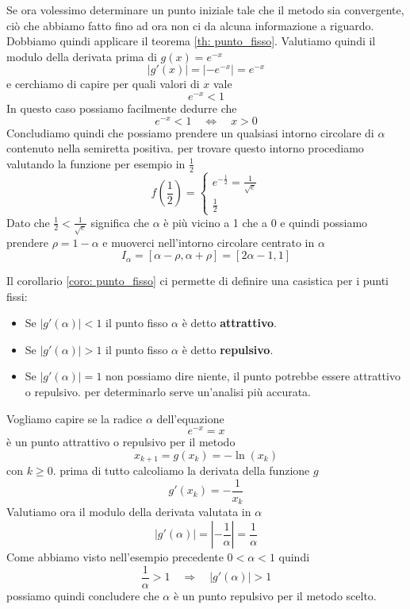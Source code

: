 \begin{example}
	Se ora volessimo determinare un punto iniziale tale che il metodo sia convergente, ciò che abbiamo fatto
	fino ad ora non ci da alcuna informazione a riguardo. Dobbiamo quindi applicare il teorema
	\ref{th: punto_fisso}. Valutiamo quindi il modulo della derivata prima di $g(x) = e^{-x}$
	\[ |g'(x)| = |-e^{-x}| = e^{-x} \]
	e cerchiamo di capire per quali valori di $x$ vale
	\[ e^{-x} < 1 \]
	In questo caso possiamo facilmente dedurre che
	\[ e^{-x} < 1 \quad \Leftrightarrow \quad x > 0 \]
	Concludiamo quindi che possiamo prendere un qualsiasi intorno circolare di $\alpha$ contenuto nella semiretta
	positiva. per trovare questo intorno procediamo valutando la funzione per esempio in $\frac{1}{2}$
	\[
		f \left( \frac{1}{2} \right) = \begin{cases}
			e^{-\frac{1}{2}} = \frac{1}{\sqrt{e}} \\
			\frac{1}{2}
		\end{cases}
	\]
	Dato che $\frac{1}{2} < \frac{1}{\sqrt{e}}$ significa che $\alpha$ è più vicino a 1 che a 0 e quindi possiamo
	prendere $\rho = 1 - \alpha$ e muoverci nell'intorno circolare centrato in $\alpha$
	\[ I_\alpha = [\alpha - \rho, \alpha + \rho] = [2\alpha - 1, 1] \]
\end{example}

\begin{definition}
	Il corollario \ref{coro: punto_fisso} ci permette di definire una casistica per i punti fissi:
	\begin{itemize}
		\item Se $|g'(\alpha)| < 1$ il punto fisso $\alpha$ è detto \textbf{attrattivo}.
		\item Se $|g'(\alpha)| > 1$ il punto fisso $\alpha$ è detto \textbf{repulsivo}.
		\item Se $|g'(\alpha)| = 1$ non possiamo dire niente, il punto potrebbe essere attrattivo o repulsivo. per
		      determinarlo serve un'analisi più accurata.
	\end{itemize}
\end{definition}

\begin{example}
	Vogliamo capire se la radice $\alpha$ dell'equazione
	\[ e^{-x} = x \]
	è un punto attrattivo o repulsivo per il metodo
	\[ x_{k+1} = g(x_k) = -\ln (x_k) \]
	con $k \geq 0$. prima di tutto calcoliamo la derivata della funzione $g$
	\[ g'(x_k) = -\frac{1}{x_k} \]
	Valutiamo ora il modulo della derivata valutata in $\alpha$
	\[ |g'(\alpha)| = \left| -\frac{1}{\alpha} \right| = \frac{1}{\alpha} \]
	Come abbiamo visto nell'esempio precedente $0 < \alpha < 1$ quindi
	\[ \frac{1}{\alpha} > 1 \quad \Rightarrow \quad |g'(\alpha)| > 1 \]
	possiamo quindi concludere che $\alpha$ è un punto repulsivo per il metodo scelto.
\end{example}
